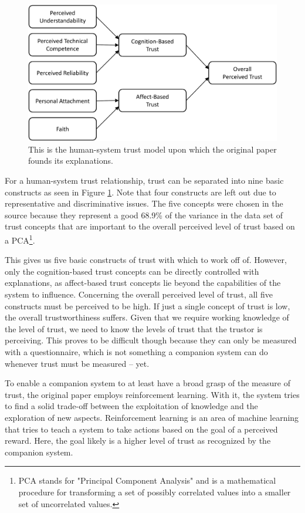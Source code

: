 \documentclass[a4paper]{article}
\begin{document}
\begin{figure}[H]
	\centering
	\includegraphics[width=12cm]{trust.png}
	\caption{This is the human-system trust model upon which the original paper founds its explanations.}
	\label{fig:hs_trust}
\end{figure}

For a human-system trust relationship, trust can be separated into nine basic constructs as seen in Figure \ref{fig:hs_trust}. Note that four constructs are left out due to representative and discriminative issues. The five concepts were chosen in the source because they represent a good 68.9\% of the variance in the data set of trust concepts that are important to the overall perceived level of trust based on a PCA\footnote{PCA stands for "Principal Component Analysis" and is a mathematical procedure for transforming a set of possibly correlated values into a smaller set of uncorrelated values.}.\cite{htc}

This gives us five basic constructs of trust with which to work off of. However, only the cognition-based trust concepts can be directly controlled with explanations, as affect-based trust concepts lie beyond the capabilities of the system to influence. Concerning the overall perceived level of trust, all five constructs must be perceived to be high. If just a single concept of trust is low, the overall trustworthiness suffers.\cite{htc} Given that we require working knowledge of the level of trust, we need to know the levels of trust that the trustor is perceiving. This proves to be difficult though because they can only be measured with a questionnaire, which is not something a companion system can do whenever trust must be measured – yet.

To enable a companion system to at least have a broad grasp of the measure of trust, the original paper employs reinforcement learning. With it, the system tries to find a solid trade-off between the exploitation of knowledge and the exploration of new aspects. Reinforcement learning is an area of machine learning that tries to teach a system to take actions based on the goal of a perceived reward. Here, the goal likely is a higher level of trust as recognized by the companion system.
\end{document}
